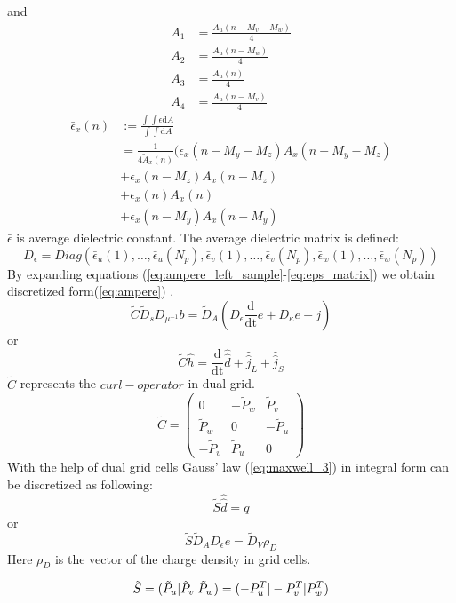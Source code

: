and
\begin{align}
A_{1}&=\frac{A_{u}(n-M_{v}-M_{w})}{4}\\
A_{2}&=\frac{A_{u}(n-M_{w})}{4}\\
A_{3}&=\frac{A_{u}(n)}{4}\\
A_{4}&=\frac{A_{u}(n-M_{v})}{4}
\end{align}
\begin{align}
\bar{\epsilon}_{x}(n)&:=\frac{\int\int\epsilon\mathrm{d}A}{\int\int\mathrm{d}A}\nonumber\\
&=\frac{1}{4\tilde{A}_{x}(n)}(\epsilon_{x}(n-M_{y}-M_{z})A_{x}(n-M_{y}-M_{z})\nonumber\\
&+\epsilon_{x}(n-M_{z})A_{x}(n-M_{z}) \nonumber\\
&+\epsilon_{x}(n)A_{x}(n) \nonumber\\
&+\epsilon_{x}(n-M_{y})A_{x}(n-M_{y})
\end{align}
$\bar{\epsilon}$ is average dielectric constant. 
The average dielectric matrix is defined:
\begin{equation}
D_{\epsilon}=Diag(\bar{\epsilon}_{u}(1),\ldots,\bar{\epsilon}_{u}(N_{p}),\bar{\epsilon}_{v}(1),\ldots,\bar{\epsilon}_{v}(N_{p}),\bar{\epsilon}_{w}(1),\ldots,\bar{\epsilon}_{w}(N_{p}))
\label{eq:eps_matrix}
\end{equation}
By expanding equations (\ref{eq:ampere_left_sample}-\ref{eq:eps_matrix}) we obtain discretized form(\ref{eq:ampere}) .
\begin{equation}
\tilde{C}\tilde{D}_{s}D_{\mu^{-1}}b=\tilde{D}_{A}(D_{\epsilon}\frac{\mathrm{d}}{\mathrm{dt}}e+D_{\kappa}e+j)
\label{eq:ampere}
\end{equation}
or
\begin{equation}
\tilde{C}\widehat{h}=\frac{\mathrm{d}}{\mathrm{dt}}\widehat{\widehat{d}}+\widehat{\widehat{j}}_{L}+\widehat{\widehat{j}}_{S}
\label{eq:ampere_sample}
\end{equation}
$\tilde{C}$ represents the $curl-operator$ in dual grid.
\begin{equation}
\tilde{C}=
	\begin{pmatrix}
	0&-\tilde{P}_{w}&\tilde{P}_{v}\\
	\tilde{P}_{w}&0&-\tilde{P}_{u}\\
	-\tilde{P}_{v}&\tilde{P}_{u}&0
	\end{pmatrix}
	\label{eq:dual_C_matrix}
\end{equation}
With the help of dual grid cells Gauss' law (\ref{eq:maxwell_3}) in integral form can be discretized\cite{script_FeldSim} as following:
\begin{equation}
\tilde{S}\widehat{\widehat{d}}=q
\label{eq:gausslaw}
\end{equation}
or
\begin{equation}
\tilde{S}\tilde{D}_{A}D_{\epsilon}e=\tilde{D}_{V}\rho_{D}
\label{eq:gausslaw_sample}
\end{equation}
Here $\rho_{D}$ is the vector of the charge density in grid cells.

\begin{equation}
\tilde{S}=(\tilde{P}_{u}|\tilde{P}_{v}|\tilde{P}_{w})=(-P_{u}^{T}|-P_{v}^{T}|\-P_{w}^{T})
\label{eq:dual_S_matrix}
\end{equation}
